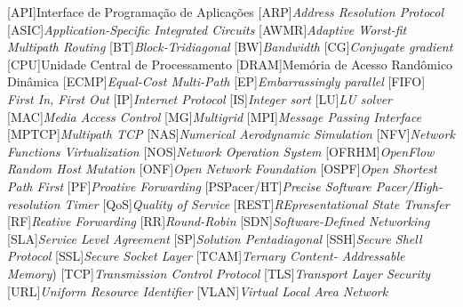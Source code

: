 \begin{acronym}
	[API]{Interface de Programação de Aplicações}
    [ARP]{\textit{Address Resolution Protocol}}
    [ASIC]{\textit{Application-Specific Integrated Circuits}}
    [AWMR]{\textit{Adaptive Worst-fit Multipath Routing}}
    [BT]{\textit{Block-Tridiagonal}}
    [BW]{\textit{Bandwidth}}
    [CG]{\textit{Conjugate gradient}}
    [CPU]{Unidade Central de Processamento}
    [DRAM]{Memória de Acesso Randômico Dinâmica}
    [ECMP]{\textit{Equal-Cost Multi-Path}}
    [EP]{\textit{Embarrassingly parallel}}
    [FIFO]{ \textit{First In, First Out}}
    [IP]{\textit{Internet Protocol}}
    [IS]{\textit{Integer sort}}
    [LU]{\textit{LU solver}}
    [MAC]{\textit{Media Access Control}}
    [MG]{\textit{Multigrid}}
    [MPI]{\textit{Message Passing Interface}}
    [MPTCP]{\textit{Multipath TCP}}
    [NAS]{\textit{Numerical Aerodynamic Simulation}}
    [NFV]{\textit{Network Functions Virtualization}}
    [NOS]{\textit{Network Operation System}}
    [OFRHM]{\textit{OpenFlow Random Host Mutation}}
    [ONF]{\textit{Open Network Foundation}}
    [OSPF]{\textit{Open Shortest Path First}}
    [PF]{\textit{Proative Forwarding}}
    [PSPacer/HT]{\textit{Precise Software Pacer/High-resolution Timer}}
    [QoS]{\textit{Quality of Service}}
    [REST]{\textit{REpresentational State Transfer}}
    [RF]{\textit{Reative Forwarding}}
	[RR]{\textit{Round-Robin}}
	[SDN]{\textit{Software-Defined Networking}}
    [SLA]{\textit{Service Level Agreement}}
    [SP]{\textit{Solution Pentadiagonal}}
    [SSH]{\textit{Secure Shell Protocol}}
    [SSL]{\textit{Secure Socket Layer}}
    [TCAM]{\textit{Ternary Content- Addressable Memory})}
    [TCP]{\textit{Transmission Control Protocol}}
	[TLS]{\textit{Transport Layer Security}}
    [URL]{\textit{Uniform Resource Identifier}}
    [VLAN]{\textit{Virtual Local Area Network}}
    
    
\end{acronym}

